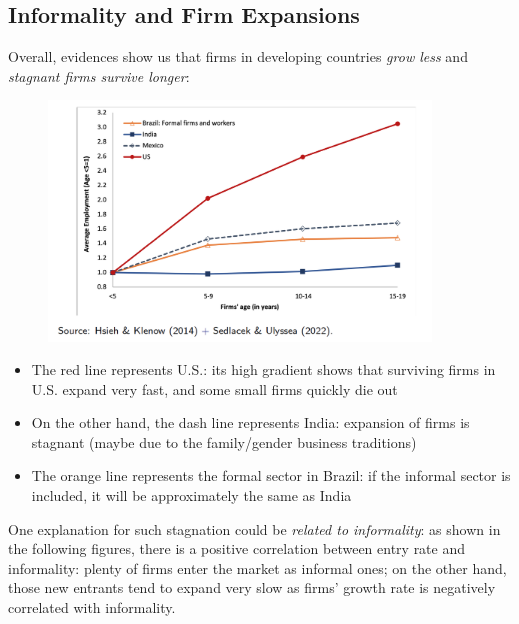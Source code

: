             \subsection{Informality and Firm Expansions}
                Overall, evidences show us that firms in developing countries \emph{grow less} and \emph{stagnant firms survive longer}:
                \begin{figure}[H]
                    \centering
                    \includegraphics[width=4in]{images/ch5/dynamics_1.png}
                    \caption{}
                \end{figure}
                \begin{itemize}
                    \item The red line represents U.S.: its high gradient shows that surviving firms in U.S. expand very fast, and some small firms quickly die out
                    \item On the other hand, the dash line represents India: expansion of firms is stagnant (maybe due to the family/gender business traditions)
                    \item The orange line represents the formal sector in Brazil: if the informal sector is included, it will be approximately the same as India
                \end{itemize}
                One explanation for such stagnation could be \emph{related to informality}: as shown in the following figures, there is a positive correlation between entry rate and informality: plenty of firms enter the market as informal ones; on the other hand, those new entrants tend to expand very slow as firms' growth rate is negatively correlated with informality.
